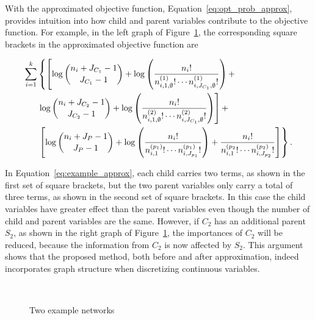 With the approximated objective function, Equation~\ref{eq:opt_prob_approx}, provides intuition into how child and parent variables contribute to the objective function.
For example, in the left graph of Figure~\ref{fig:example_networks}, the corresponding square brackets in the approximated objective function are

\begin{small}
  \begin{equation}
  \begin{aligned}
  \label{eq:example_approx}
   \sum_{i=1}^k & \left\lbrace   \left[ \log{{n_{i} + J_{C_1} - 1}\choose{J_{C_1}-1}} + \log \left(  {{{n_i}!} \over { {n^{(1)}_{i,1,\emptyset} !} \cdots {n^{(1)}_{i,J_{C_1},\emptyset} !}} }  \right)  +  \right. \right.\\
  & \left.  \log{{n_{i} + J_{C_2} - 1}\choose{J_{C_2}-1}} + \log \left(  {{{n_i}!} \over { {n^{(2)}_{i,1,\emptyset} !} \cdots {n^{(2)}_{i,J_{C_1},\emptyset} !}} }  \right)  \right] + \\
  &  \left. \left[  \log {{n_{i} + J_P - 1}\choose{J_P-1}} +  \log \left( { {{{n}_i}!}\over{ {n^{(p_1)}_{i,1} !}\cdots {n^{(p_1)}_{i,J_{p_1}} !}}} \right) +{ {{{n}_i}!}\over{ {n^{(p_2}_{i,1} !}\cdots {n^{(p_2)}_{i,J_{p_2}} !}}}  \right] \right\rbrace \text{.}
  \end{aligned}
  \end{equation}
\end{small}

In Equation~\ref{eq:example_approx}, each child carries two terms, as shown in the first set of square brackets, but the two parent variables only carry a total of three terms, as shown in the second set of square brackets.
In this case the child variables have greater effect than the parent variables even though the number of child and parent variables are the same.
However, if $C_2$ has an additional parent $S_2$, as shown in the right graph of Figure~\ref{fig:example_networks}, the importances of $C_2$ will be reduced, because the information from $C_2$ is now affected by $S_2$.
This argument shows that the proposed method, both before and after approximation, indeed incorporates graph structure when discretizing continuous variables.

\begin{figure}[ht]
  \centering
  \begin{tabular}{cc}
    
    \end{tabular}
   \hspace{5em}
    \begin{tabular}{cc}
    
  \end{tabular}
  \caption{Two example networks}
  \label{fig:example_networks}
\end{figure}


